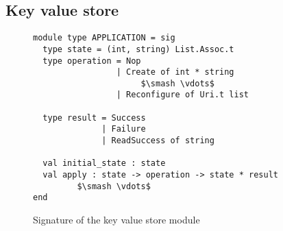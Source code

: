 \subsection{Key value store}

\begin{figure}
  \begin{lstlisting}[mathescape=true]
module type APPLICATION = sig
  type state = (int, string) List.Assoc.t
  type operation = Nop                  
                 | Create of int * string  
                      $\smash \vdots$   
                 | Reconfigure of Uri.t list

  type result = Success 
              | Failure
              | ReadSuccess of string
                  
  val initial_state : state
  val apply : state -> operation -> state * result
         $\smash \vdots$
end
  \end{lstlisting}
    \caption{Signature of the key value store module}
    \label{fig:key-value-store}
  \centering
\end{figure}

